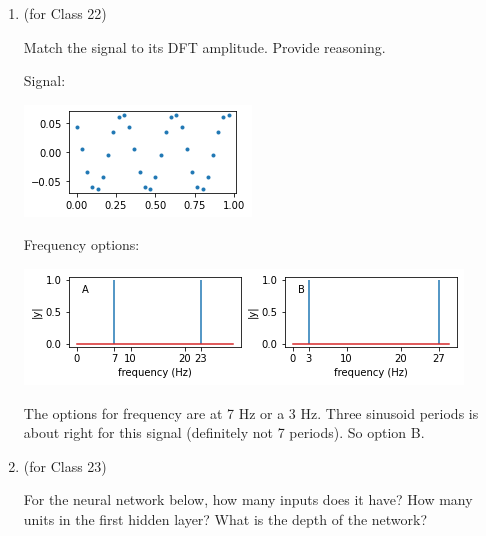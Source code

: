 \documentclass[12pt,letterpaper,answers]{exam}
\begin{document}
\begin{enumerate}
\item (for Class 22)

Match the signal to its DFT amplitude.  Provide reasoning.

Signal:

\includegraphics[width=0.3\linewidth]{img/C21skill.png}

Frequency options:

\includegraphics[width=0.7\linewidth]{img/C21skill2.png}

\begin{solution}
The options for frequency are at 7 Hz or a 3 Hz.  Three sinusoid periods is about right for this signal (definitely not 7 periods).  So option B.
\end{solution}


\item (for Class 23)

For the neural network below, how many inputs does it have?  How many units in the first hidden layer?  What is the depth of the network?


\end{enumerate}
\end{document}
